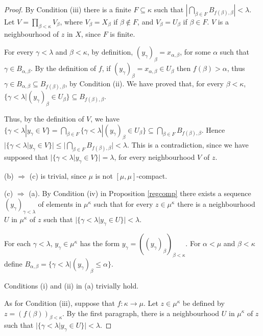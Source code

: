 \documentclass[12pt]{amsart}
\theoremstyle{definition}
\theoremstyle{remark}
\begin{document}
\begin{proof}
By Condition (iii) 
there is a finite $F \subseteq \kappa $ such that  
$|\bigcap _{\beta \in F} B_{ f( \beta) , \beta }| < \lambda  $.   
Let $V=\prod_{\beta<\kappa} V_\beta$, where 
$V_\beta=X_\beta$ if $\beta \not \in F$, and
$V_\beta=U_\beta$ if $\beta \in F$.
$V$ is a neighbourhood of $z$ in $X$, since $F$
is finite.

For every $ \gamma<\lambda$ and $\beta<\kappa$,
by  definition,  $(y_\gamma )_\beta = x_{\alpha, \beta}$, for some $\alpha $ 
such that $\gamma \in B_{ \alpha , \beta } $. By the definition of $f$,
if $(y_\gamma )_\beta = x_{\alpha, \beta}\in U_\beta$ then 
$f(\beta )>\alpha $, thus $ \gamma  \in B_{ \alpha , \beta } \subseteq B_{ f( \beta ), \beta  }$,
by Condition (ii).
We have proved that,
for every $\beta<\kappa$, 
$\{\gamma<\lambda| (y_\gamma )_\beta \in U_\beta\} \subseteq B_{ f(\beta), \beta }$.

Thus, by the definition of $V$, we have
$\{\gamma<\lambda| y_\gamma \in V\}=
\bigcap _{\beta \in F} 
\{\gamma<\lambda| (y_\gamma )_\beta \in U_\beta\}
\subseteq \bigcap _{\beta \in F} 
B_{ f(\beta), \beta }$.
 Hence 
$|\{\gamma<\lambda| y_\gamma \in V\}|
\leq |\bigcap _{ \beta  \in F} 
B_{ f(\beta), \beta }| < \lambda $.
This is a contradiction, since 
we have supposed that 
$|\{\gamma<\lambda| y_\gamma \in V\}| =\lambda$,
for every 
neighbourhood $V$ of $z$.  

(b) $\Rightarrow$ (c) is trivial, since $\mu$ is not  
$[ \mu, \mu]$-compact.

(c) $\Rightarrow$ (a).
By Condition (iv) in Proposition \ref{regcomp}
there exists a sequence 
$ (y_ \gamma ) _{ \gamma < \lambda } $
of elements in $ \mu ^ \kappa $
such that   
for every $z \in \mu ^ \kappa $
 there is a neighbourhood $U$ in $\mu ^ \kappa $ of $z$
 such that 
$ |\{\gamma<\lambda| y_\gamma \in U\}|<  \lambda$.

For each $ \gamma < \lambda $,  
$y_\gamma  \in \mu ^ \kappa  $ has the form
$y_\gamma =((y_\gamma )_\beta)_{\beta<\kappa} $.
For $ \alpha < \mu$ and $ \beta < \kappa $ define
$B _{ \alpha, \beta } = 
\{ \gamma < \lambda | (y_\gamma )_\beta  \leq \alpha \}$.
 
Conditions (i) and (ii) in (a) trivially hold.

As for Condition (iii), suppose that $f: \kappa \to \mu$.
Let $z\in \mu^ \kappa $ be defined by 
$z=(f( \beta )) _{ \beta < \kappa } $.
By the first paragraph, 
there is a neighbourhood $U$ in $\mu ^ \kappa $ of $z$
 such that 
$ |\{\gamma<\lambda| y_\gamma \in U\}|<  \lambda$.


\end{proof}
\end{document}

